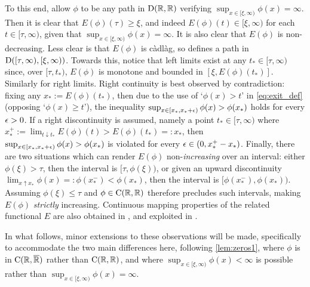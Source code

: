 To this end, allow $\phi$ to be any path in $\mathrm{D}(\mathbb{R},\mathbb{R})$ verifying $\sup_{x\in[\xi,\infty)}\phi(x)=\infty$. Then it is clear that $E(\phi)(\tau)\ge\xi$, and indeed $E(\phi)(t)\in[\xi,\infty)$ for each $t\in[\tau,\infty)$, given that $\sup_{x\in[\xi,\infty)}\phi(x)=\infty$. It is also clear that $E(\phi)$ is non-decreasing. Less clear is that $E(\phi)$ is c\`adl\`ag, so defines a path in $\mathrm{D}([\tau,\infty),[\xi,\infty))$. Towards this, notice that left limits exist at any $t_*\in[\tau,\infty)$ since, over $[\tau,t_*)$, $E(\phi)$ is monotone and bounded in $[\xi,E(\phi)(t_*)]$. Similarly for right limits. Right continuity is best observed by contradiction: fixing any $x_*:=E(\phi)(t_*)$, then due to the use of `$\phi(x)>t$' in \autoref{eq:exit_def} (opposing `$\phi(x)\ge t$'), the inequality $\sup_{x\in[x_*,x_*+\epsilon)}\phi(x)>\phi(x_*)$ holds for every $\epsilon>0$. If a right discontinuity is assumed, namely a point $t_*\in[\tau,\infty)$ where $x_*^+:=\lim_{t\downarrow t_*}E(\phi)(t)>E(\phi)(t_*)=:x_*$, then $\sup_{x\in[x_*,x_*+\epsilon)}\phi(x)>\phi(x_*)$ is violated for every $\epsilon\in(0,x_*^+-x_*)$. Finally, there are two situations which can render $E(\phi)$ non-\emph{increasing} over an interval: either $\phi(\xi)>\tau$, then the interval is $[\tau,\phi(\xi))$, or given an upward discontinuity $\lim_{x\uparrow x_*}\phi(x)=:\phi(x_*^-)<\phi(x_*)$, then the interval is $[\phi(x_*^-),\phi(x_*))$. Assuming $\phi(\xi)\le\tau$ and $\phi\in\mathrm{C}(\mathbb{R},\mathbb{R})$ therefore precludes such intervals, making $E(\phi)$ \emph{strictly} increasing. Continuous mapping properties of the related functional $E$ are also obtained in \cite{whitt_1971}, and exploited in \cite{puhalskii_1997}.

In what follows, minor extensions to these observations will be made, specifically to accommodate the two main differences here, following \autoref{lem:zeros1}, where $\phi$ is in $\mathrm{C}(\mathbb{R},{\overline{\mathbb{R}}})$ rather than $\mathrm{C}(\mathbb{R},\mathbb{R})$, and where $\sup_{x\in[\xi,\infty)}\phi(x)<\infty$ is possible rather than $\sup_{x\in[\xi,\infty)}\phi(x)=\infty$.

